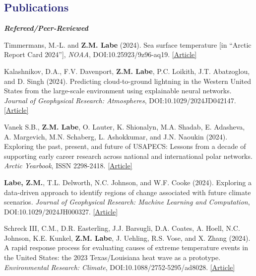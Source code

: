\documentclass[margin,line,palatino,courier,10pt]{res}
\begin{document}
\begin{resume}
\section{\sc \large{\textcolor{MidnightBlue}{\textbf{Publications}}}} 
\textit{\textbf{Refereed/Peer-Reviewed}}
\vspace*{-0.1in}\\
\begin{etaremune}[leftmargin=0in,topsep=0in,parsep=0in]
\item Timmermans, M.-L. and \textbf{Z.M. Labe} (2024). Sea surface temperature [in ``Arctic Report Card 2024''], \textit{NOAA}, DOI:10.25923/9z96-aq19. \href{https://arctic.noaa.gov/report-card/report-card-2024/sea-surface-temperature-2024/}{[Article]}
\item Kalashnikov, D.A., F.V. Davenport, \textbf{Z.M. Labe}, P.C. Loikith, J.T. Abatzoglou, and D. Singh (2024). Predicting cloud-to-ground lightning in the Western United States from the large-scale environment using explainable neural networks. \textit{Journal of Geophysical Research: Atmospheres}, DOI:10.1029/2024JD042147. \href{https://doi.org/10.1029/2024JD042147}{[Article]}
\item Vanek S.B., \textbf{Z.M. Labe}, O. Lauter, K. Shionalyn, M.A. Shadab, E. Adasheva, A. Margevich, M.N. Schaberg, L. Ashokkumar, and J.N. Naoukin (2024). Exploring the past, present, and future of USAPECS: Lessons from a decade of supporting early career research across national and international polar networks. \textit{Arctic Yearbook}, ISSN 2298-2418. \href{https://arcticyearbook.com/arctic-yearbook/2024/2024-briefing-notes/534-exploring-the-past-present-and-future-of-usapecs-lessons-from-a-decade-of-supporting-early-career-research-across-national-and-international-polar-networks}{[Article]}
\item \textbf{Labe, Z.M.}, T.L. Delworth, N.C. Johnson, and W.F. Cooke (2024). Exploring a data-driven approach to identify regions of change associated with future climate scenarios. \textit{Journal of Geophysical Research: Machine Learning and Computation}, DOI:10.1029/2024JH000327. \href{https://doi.org/10.1029/2024JH000327}{[Article]}
\item Schreck III, C.M., D.R. Easterling, J.J. Barsugli, D.A. Coates, A. Hoell, N.C. Johnson, K.E. Kunkel, \textbf{Z.M. Labe}, J. Uehling, R.S. Vose, and X. Zhang (2024). A rapid response process for evaluating causes of extreme temperature events in the United States: the 2023 Texas/Louisiana heat wave as a prototype. \textit{Environmental Research: Climate}, DOI:10.1088/2752-5295/ad8028. \href{https://iopscience.iop.org/article/10.1088/2752-5295/ad8028}{[Article]}

\end{etaremune}
\end{resume}
\end{document}
